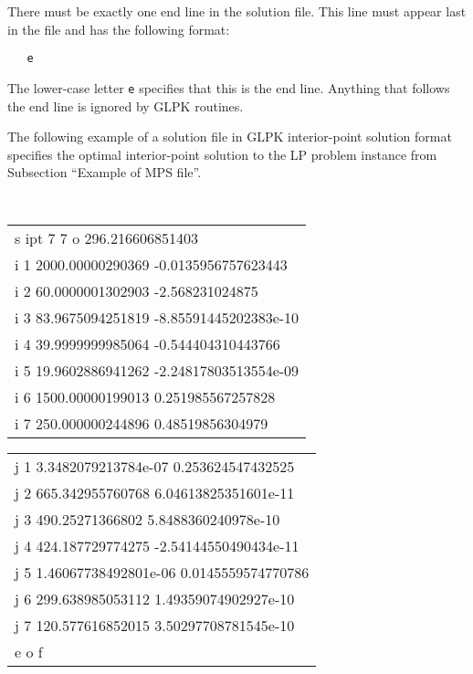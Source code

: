  There must be exactly one end line in the solution
file. This line must appear last in the file and has the following
format:

\begin{verbatim}
   e
\end{verbatim}

The lower-case letter \verb|e| specifies that this is the end line.
Anything that follows the end line is ignored by GLPK routines.


The following example of a solution file in GLPK interior-point
solution format specifies the optimal interior-point solution to the LP
problem instance from Subsection ``Example of MPS file''.

\bigskip

\begin{center}
\footnotesize\tt
\begin{tabular}{l@{\hspace*{10pt}}}
s ipt 7 7 o 296.216606851403                 \\
i 1 2000.00000290369 -0.0135956757623443     \\
i 2 60.0000001302903 -2.568231024875         \\
i 3 83.9675094251819 -8.85591445202383e-10   \\
i 4 39.9999999985064 -0.544404310443766      \\
i 5 19.9602886941262 -2.24817803513554e-09   \\
i 6 1500.00000199013 0.251985567257828       \\
i 7 250.000000244896 0.48519856304979        \\
\end{tabular}
\begin{tabular}{|@{\hspace*{10pt}}l}
j 1 3.3482079213784e-07 0.253624547432525    \\
j 2 665.342955760768 6.04613825351601e-11    \\
j 3 490.25271366802 5.8488360240978e-10      \\
j 4 424.187729774275 -2.54144550490434e-11   \\
j 5 1.46067738492801e-06 0.0145559574770786  \\
j 6 299.638985053112 1.49359074902927e-10    \\
j 7 120.577616852015 3.50297708781545e-10    \\
e o f
\end{tabular}
\end{center}


